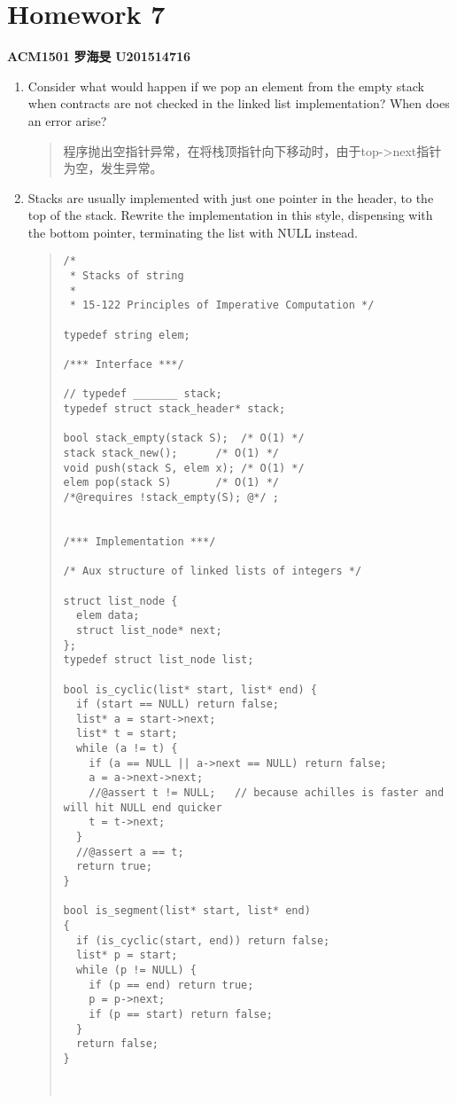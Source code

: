 \documentclass[]{article}
\date{}
\begin{document}
\section{Homework 7}\label{header-n129}

\textbf{ACM1501} \textbf{罗海旻} \textbf{U201514716}

\begin{enumerate}
\def\labelenumi{\arabic{enumi}.}
\item
  Consider what would happen if we pop an element from the empty stack
  when contracts are not checked in the linked list implementation? When
  does an error arise?

  \begin{quote}
  程序抛出空指针异常，在将栈顶指针向下移动时，由于top-\textgreater{}next指针为空，发生异常。
  \end{quote}
\item
  Stacks are usually implemented with just one pointer in the header, to
  the top of the stack. Rewrite the implementation in this style,
  dispensing with the bottom pointer, terminating the list with NULL
  instead.

  \begin{quote}
\begin{verbatim}
/* 
 * Stacks of string
 * 
 * 15-122 Principles of Imperative Computation */

typedef string elem;

/*** Interface ***/

// typedef _______ stack;
typedef struct stack_header* stack;

bool stack_empty(stack S);	/* O(1) */
stack stack_new();		/* O(1) */
void push(stack S, elem x);	/* O(1) */
elem pop(stack S)		/* O(1) */
/*@requires !stack_empty(S); @*/ ;


/*** Implementation ***/

/* Aux structure of linked lists of integers */

struct list_node {
  elem data;
  struct list_node* next;
};
typedef struct list_node list;

bool is_cyclic(list* start, list* end) {
  if (start == NULL) return false;
  list* a = start->next;
  list* t = start;
  while (a != t) {
    if (a == NULL || a->next == NULL) return false;
    a = a->next->next;
    //@assert t != NULL;   // because achilles is faster and will hit NULL end quicker
    t = t->next;
  }
  //@assert a == t;
  return true;
}

bool is_segment(list* start, list* end)
{
  if (is_cyclic(start, end)) return false;
  list* p = start;
  while (p != NULL) {
    if (p == end) return true;
    p = p->next;
    if (p == start) return false;
  }
  return false;
}



\end{verbatim}
\end{quote}
\end{enumerate}
\end{document}
